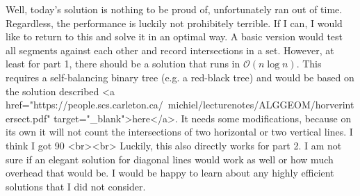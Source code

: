 Well, today's solution is nothing to be proud of, unfortunately ran out of time. Regardless, the performance is luckily not prohibitely terrible. If I can, I would like to return to this and solve it in an optimal way. A basic version would test all segments against each other and record intersections in a set. However, at least for part 1, there should be a solution that runs in $\mathcal{O}(n \log n)$. This requires a self-balancing binary tree (e.g. a red-black tree) and would be based on the solution described <a href="https://people.scs.carleton.ca/~michiel/lecturenotes/ALGGEOM/horverintersect.pdf" target="_blank">here</a>. It needs some modifications, because on its own it will not count the intersections of two horizontal or two vertical lines. I think I got 90%
<br><br>
Luckily, this also directly works for part 2. I am not sure if an elegant solution for diagonal lines would work as well or how much overhead that would be. I would be happy to learn about any highly efficient solutions that I did not consider.